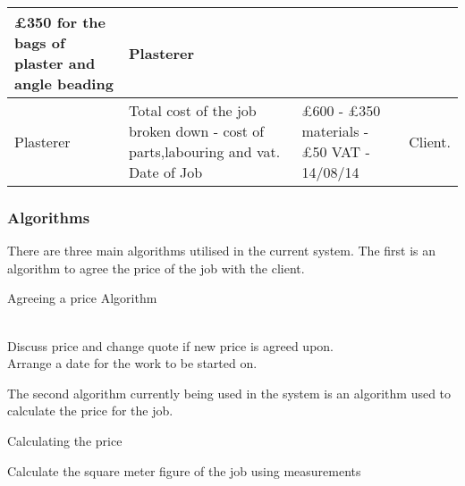 \begin{center}
\begin{tabular}{|p{3cm}|p{3cm}|p{3cm}|p{3cm}|}
\pounds 350 for the bags of plaster and angle beading &

Plasterer


\\
\hline

Plasterer &

Total cost of the job broken down - cost of parts,labouring and vat. Date of Job &

\pounds 600 - \pounds 350 materials - \pounds 50 VAT - 14/08/14 &

Client.

\\
        \hline
    \end{tabular}
\end{center}


\subsubsection{Algorithms}

There are three main algorithms utilised in the current system. The first is an algorithm to agree the price of the job with the client.

\begin{algorithm}[H]
\label{fig:algorithm_example_1}
	\caption{Agreeing a price Algorithm}
\begin{algorithmic}[1]

	
					\\ Discuss price and change quote if new price is agreed upon.\;
		\Else 
			  \\ Arrange a date for the work to be started on.\;
		\EndIf
	\EndWhile

\end{algorithmic}
\end{algorithm}


The second algorithm currently being used in the system is an algorithm used to calculate the price for the job.


\begin{algorithm}[H]
	\label{fig:algorithm_calculate_price}
		\caption{Calculating the price }
	\begin{algorithmic}[1]
			Calculate the square meter figure of the job using measurements \;
				
				
				
		\EndWhile

	\end{algorithmic}

\end{algorithm}




